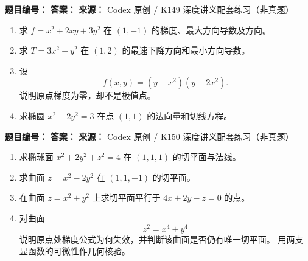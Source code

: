 \begin{problemBox}
\begin{problemMeta}
\textbf{题目编号：}  \quad
\textbf{答案：}  \quad
\textbf{来源：} Codex 原创 / K149 深度讲义配套练习（非真题）
\end{problemMeta}
\begin{enumerate}
\item[\textbf{A}] 求 \(f=x^2+2xy+3y^2\) 在 \((1,-1)\) 的梯度、最大方向导数及方向。
\item[\textbf{B}] 求 \(T=3x^2+y^2\) 在 \((1,2)\) 的最速下降方向和最小方向导数。
\item[\textbf{C}] 设
\[
f(x,y)=(y-x^2)(y-2x^2).
\]
说明原点梯度为零，却不是极值点。
\item[\textbf{M}] 求椭圆 \(x^2+2y^2=3\) 在点 \((1,1)\) 的法向量和切线方程。
\end{enumerate}
\end{problemBox}

\begin{problemBox}
\begin{problemMeta}
\textbf{题目编号：}  \quad
\textbf{答案：}  \quad
\textbf{来源：} Codex 原创 / K150 深度讲义配套练习（非真题）
\end{problemMeta}
\begin{enumerate}
\item[\textbf{A}] 求椭球面 \(x^2+2y^2+z^2=4\) 在 \((1,1,1)\) 的切平面与法线。
\item[\textbf{B}] 求曲面 \(z=x^2-2y^2\) 在 \((1,1,-1)\) 的切平面。
\item[\textbf{C}] 在曲面 \(z=x^2+y^2\) 上求切平面平行于
\(4x+2y-z=0\) 的点。
\item[\textbf{M}] 对曲面
\[
z^2=x^4+y^4
\]
说明原点处梯度公式为何失效，并判断该曲面是否仍有唯一切平面。
用两支显函数的可微性作几何核验。
\end{enumerate}
\end{problemBox}

